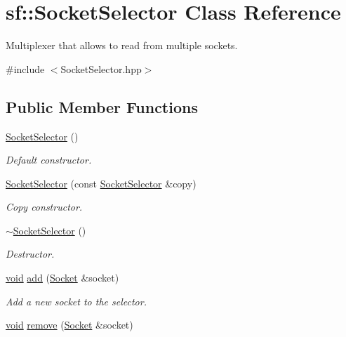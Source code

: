 \hypertarget{classsf_1_1_socket_selector}{\section{sf\-:\-:Socket\-Selector Class Reference}
\label{classsf_1_1_socket_selector}
}


Multiplexer that allows to read from multiple sockets.  




{\ttfamily \#include $<$Socket\-Selector.\-hpp$>$}

\subsection*{Public Member Functions}
\begin{DoxyCompactItemize}
\item 
\hyperlink{classsf_1_1_socket_selector_a741959c5158aeb1e4457cad47d90f76b}{Socket\-Selector} ()
\begin{DoxyCompactList}\small\item\em Default constructor. \end{DoxyCompactList}\item 
\hyperlink{classsf_1_1_socket_selector_a50b1b955eb7ecb2e7c2764f3f4722fbf}{Socket\-Selector} (const \hyperlink{classsf_1_1_socket_selector}{Socket\-Selector} \&copy)
\begin{DoxyCompactList}\small\item\em Copy constructor. \end{DoxyCompactList}\item 
\hyperlink{classsf_1_1_socket_selector_a9069cd61208260b8ed9cf233afa1f73d}{$\sim$\-Socket\-Selector} ()
\begin{DoxyCompactList}\small\item\em Destructor. \end{DoxyCompactList}\item 
\hyperlink{glutf90_8h_ac778d6f63f1aaf8ebda0ce6ac821b56e}{void} \hyperlink{classsf_1_1_socket_selector_ade952013232802ff7b9b33668f8d2096}{add} (\hyperlink{classsf_1_1_socket}{Socket} \&socket)
\begin{DoxyCompactList}\small\item\em Add a new socket to the selector. \end{DoxyCompactList}\item 
\hyperlink{glutf90_8h_ac778d6f63f1aaf8ebda0ce6ac821b56e}{void} \hyperlink{classsf_1_1_socket_selector_a98b6ab693a65b82caa375639232357c1}{remove} (\hyperlink{classsf_1_1_socket}{Socket} \&socket)

\end{DoxyCompactItemize}

